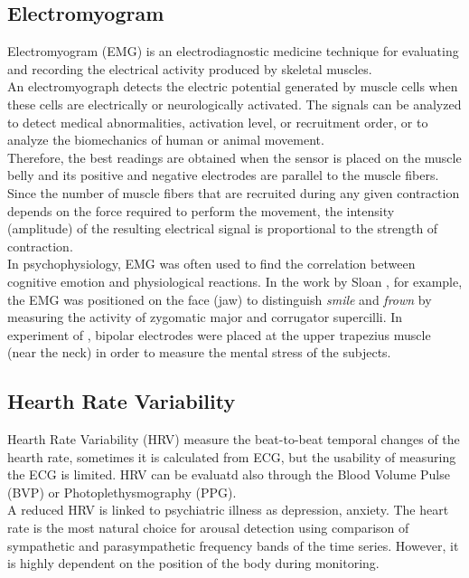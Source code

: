 \subsection{Electromyogram}
Electromyogram (EMG) is an electrodiagnostic medicine technique for evaluating and recording the electrical activity produced by skeletal muscles.
\\
An electromyograph detects the electric potential generated by muscle cells when these cells are electrically or neurologically activated. The signals can be analyzed to detect medical abnormalities, activation level, or recruitment order, or to analyze the biomechanics of human or animal movement.
\\ \indent
Therefore, the best readings are obtained when the sensor is placed on the muscle belly and its positive and negative electrodes are parallel to the muscle fibers. Since the number of muscle fibers that are recruited during any given contraction depends on the force required to perform the movement, the intensity (amplitude) of the resulting electrical signal is proportional to the strength of contraction.
\\ \indent
In psychophysiology, EMG was often used to find the correlation between cognitive emotion and physiological reactions. In the work by Sloan \cite{sloan2004emotion}, for example, the EMG was positioned on the face (jaw) to distinguish \textit{smile} and \textit{frown} by measuring the activity of zygomatic major and corrugator supercilli. In experiment of \cite{kim2008emotion}, bipolar electrodes were placed at the upper trapezius muscle (near the neck) in order to measure the mental stress of the subjects.

\subsection{Hearth Rate Variability}
Hearth Rate Variability (HRV) measure the beat-to-beat temporal changes of the hearth rate, sometimes it is calculated from ECG, but the usability of measuring the ECG is limited. HRV can be evaluatd also through the Blood Volume Pulse (BVP) or Photoplethysmography (PPG).
\\ \indent
A reduced HRV is linked to psychiatric illness as depression, anxiety. The heart rate is the most natural choice for arousal detection using comparison of sympathetic and parasympathetic frequency bands of the time series. However, it is highly dependent on the position of the body during monitoring.

